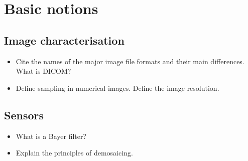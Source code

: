 

\section{Basic notions}
\subsection{Image characterisation}
\begin{qbox}\begin{itemize}
 \item Cite the names of the major image file formats and their main differences. What is DICOM?
 \item Define sampling in numerical images. Define the image resolution. 
\end{itemize}
\end{qbox}
% 
% 

\subsection{Sensors}
\begin{qbox}\begin{itemize}
 \item What is a Bayer filter?
 \item Explain the principles of demosaicing. 
\end{itemize}
\end{qbox}


